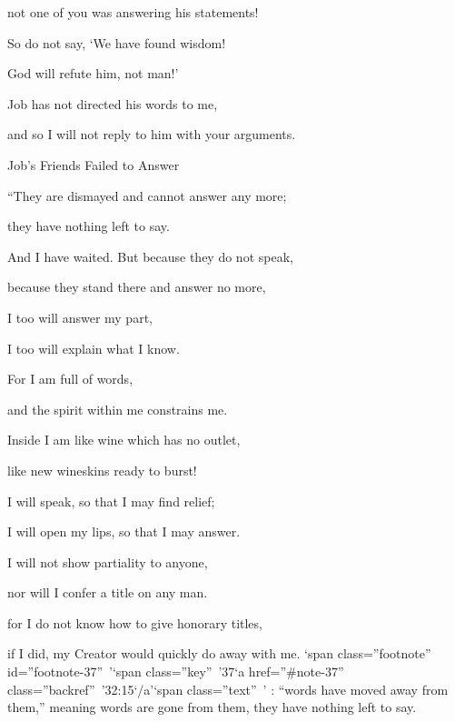 {\par }{\Q not
one of you was answering
his statements!
\par }{\Q {}So do not
say, ‘We have found
wisdom!
\par }{\Q God
will refute
him, not
man!’
\par }{\Q {}Job has not
directed
his words
to me,
\par }{\Q and so I will not
reply
to him
with your arguments.
\par }{\SH Job’s Friends Failed to Answer
\par }{\Q {}“They are
dismayed
and cannot
answer
any more;
\par }{\Q they have nothing left
to say.
\par }{\Q {}And I have waited.
But because
they do not
speak,
\par }{\Q because
they stand
there and answer
no
more,
\par }{\Q {}I
too will answer
my part,
\par }{\Q I
too will explain
what I
know.
\par }{\Q {}For
I am full
of words,
\par }{\Q and the spirit
within me constrains me.
\par }{\Q {}Inside
I am like wine
which has no
outlet,
\par }{\Q like new
wineskins
ready to burst!
\par }{\Q {}I will speak,
so that I may find relief;
\par }{\Q I will open
my lips,
so that I may answer.
\par }{\Q {}I will not
show
partiality
to
anyone,
\par }{\Q nor
will I confer a title
on any man.
\par }{\Q {}for
I do not
know
how to give honorary
titles,
\par }{\Q if I did,
my Creator
would quickly do away with me. ‘span class=”footnote” id=”footnote-37” ’‘span class=”key” ’37‘a href=”\#note-37” class=”backref” ’32:15‘/a’‘span class=”text” ’
{}:
{} “words have moved away from them,” meaning words are gone from them, they have nothing left to say.

}
